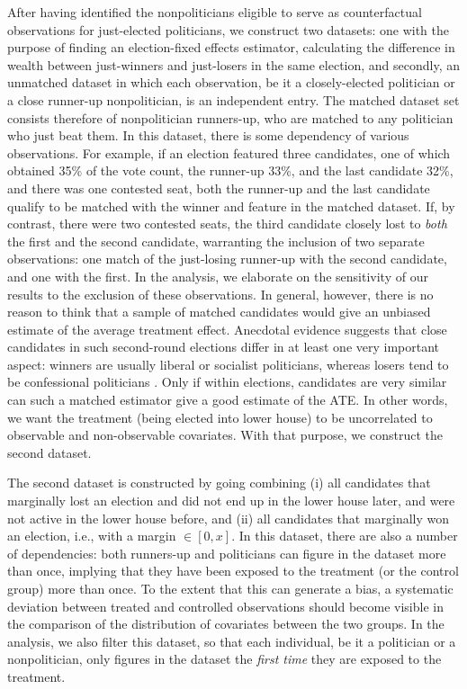 \documentclass[12pt]{article}
\begin{document}
After having identified the nonpoliticians eligible to serve as counterfactual observations for just-elected politicians, we construct two datasets: one with the purpose of finding an election-fixed effects estimator, calculating the difference in wealth between just-winners and just-losers in the same election, and secondly, an unmatched dataset in which each observation, be it a closely-elected politician or a close runner-up nonpolitician, is an independent entry. The matched dataset set consists therefore of nonpolitician runners-up, who are matched to any politician who just beat them. In this dataset, there is some dependency of various observations. For example, if an election featured three candidates, one of which obtained 35\% of the vote count, the runner-up 33\%, and the last candidate 32\%, and there was one contested seat, both the runner-up and the last candidate qualify to be matched with the winner and feature in the matched dataset. If, by contrast, there were two contested seats, the third candidate closely lost to \textit{both} the first and the second candidate, warranting the inclusion of two separate observations: one match of the just-losing runner-up with the second candidate, and one with the first. In the analysis, we elaborate on the sensitivity of our results to the exclusion of these observations. In general, however, there is no reason to think that a sample of matched candidates would give an unbiased estimate of the average treatment effect. Anecdotal evidence suggests that close candidates in such second-round elections differ in at least one very important aspect: winners are usually liberal or socialist politicians, whereas losers tend to be confessional politicians \citep{huizinga1979een}. Only if within elections, candidates are very similar can such a matched estimator give a good estimate of the ATE. In other words, we want the treatment (being elected into lower house) to be uncorrelated to observable and non-observable covariates. With that purpose, we construct the second dataset. 

The second dataset is constructed by going combining (i) all candidates that marginally lost an election and did not end up in the lower house later, and were not active in the lower house before, and (ii) all candidates that marginally won an election, i.e., with a margin $\in [0, x]$. In this dataset, there are also a number of dependencies: both runners-up and politicians can figure in the dataset more than once, implying that they have been exposed to the treatment (or the control group) more than once. To the extent that this can generate a bias, a systematic deviation between treated and controlled observations should become visible in the comparison of the distribution of covariates between the two groups. In the analysis, we also filter this dataset, so that each individual, be it a politician or a nonpolitician, only figures in the dataset the \textit{first time} they are exposed to the treatment. 
\end{document}
